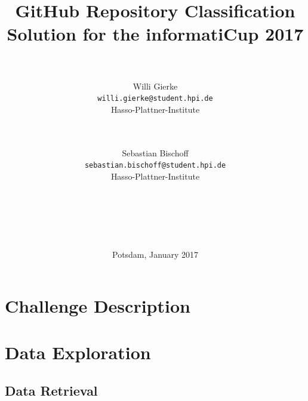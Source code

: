\documentclass[%
a4paper,
DIV12,
2.5headlines,
bigheadings,
titlepage,
openbib,
]{scrartcl}
\begin{document}
\providecommand{\tightlist}{%
  \setlength{\itemsep}{0pt}\setlength{\parskip}{0pt}}

\DeclareRobustCommand{\desiredTitle}{
  GitHub Repository Classification\\\normalsize{Solution for the informatiCup 2017}
}

\DeclareRobustCommand{\desiredAuthor}{
  \\\\Willi Gierke\\\texttt{willi.gierke@student.hpi.de}\\Hasso-Plattner-Institute \and \\\\Sebastian Bischoff\\\texttt{sebastian.bischoff@student.hpi.de}\\Hasso-Plattner-Institute\\\\\\\\\\\\
}

\begin{titlepage}
\begin{center}
   \title{\desiredTitle}
   \author{\desiredAuthor}
   \date{Potsdam, January 2017}
   \maketitle
\end{center}
\end{titlepage}

\pagebreak

\tableofcontents
\pagebreak

\section{Challenge Description}\label{challenge-description}


\section{Data Exploration}\label{data-exploration}



\subsection{Data Retrieval}\label{data-retrieval}
\end{document}
